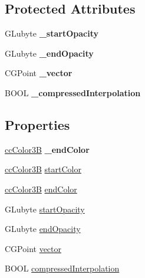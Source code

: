 \subsection*{Protected Attributes}
\begin{DoxyCompactItemize}
\item 
\hypertarget{interface_c_c_layer_gradient_a2109b5f61aac593b397e834c046b0001}{G\-Lubyte {\bfseries \-\_\-start\-Opacity}}\label{interface_c_c_layer_gradient_a2109b5f61aac593b397e834c046b0001}

\item 
\hypertarget{interface_c_c_layer_gradient_ab6180f1c037a2360b2b0170944353f4d}{G\-Lubyte {\bfseries \-\_\-end\-Opacity}}\label{interface_c_c_layer_gradient_ab6180f1c037a2360b2b0170944353f4d}

\item 
\hypertarget{interface_c_c_layer_gradient_ac1a05458c5f13730cc63a00c7bc8b2ef}{C\-G\-Point {\bfseries \-\_\-vector}}\label{interface_c_c_layer_gradient_ac1a05458c5f13730cc63a00c7bc8b2ef}

\item 
\hypertarget{interface_c_c_layer_gradient_ae8be41ca9ec84ddce1623a72ce542c89}{B\-O\-O\-L {\bfseries \-\_\-compressed\-Interpolation}}\label{interface_c_c_layer_gradient_ae8be41ca9ec84ddce1623a72ce542c89}

\end{DoxyCompactItemize}
\subsection*{Properties}
\begin{DoxyCompactItemize}
\item 
\hypertarget{interface_c_c_layer_gradient_ab356bdfffcd02d62ab4c7ca6a2cb6802}{\hyperlink{cc_types_8h_a829b00c53e72f0115e3880cb508fec1e}{cc\-Color3\-B} {\bfseries \-\_\-end\-Color}}\label{interface_c_c_layer_gradient_ab356bdfffcd02d62ab4c7ca6a2cb6802}

\item 
\hyperlink{cc_types_8h_a829b00c53e72f0115e3880cb508fec1e}{cc\-Color3\-B} \hyperlink{interface_c_c_layer_gradient_a0d7d758e03573dc191226deced04f573}{start\-Color}
\item 
\hyperlink{cc_types_8h_a829b00c53e72f0115e3880cb508fec1e}{cc\-Color3\-B} \hyperlink{interface_c_c_layer_gradient_ab7b61460bac5bc3d26e75ef614490b41}{end\-Color}
\item 
G\-Lubyte \hyperlink{interface_c_c_layer_gradient_a29b2945aaed5f50e0bf35d358de0bdde}{start\-Opacity}
\item 
G\-Lubyte \hyperlink{interface_c_c_layer_gradient_a4dd1259e4cb9649f93aa91c9e54e7a36}{end\-Opacity}
\item 
C\-G\-Point \hyperlink{interface_c_c_layer_gradient_a9e09efd298052caea75cf7517c98567c}{vector}
\item 
B\-O\-O\-L \hyperlink{interface_c_c_layer_gradient_ad8cd6a119a30dc4a214a04a090f3e837}{compressed\-Interpolation}
\end{DoxyCompactItemize}


